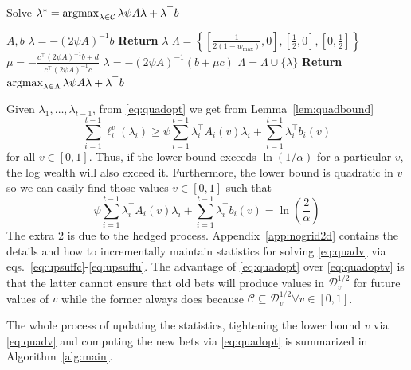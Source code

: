\begin{algorithm}[tb]
   \caption{Solve $\lambda^* = \operatorname*{argmax}_{\lambda \in \mathcal{C}} \lambda \psi A \lambda + \lambda^\top b$}
   \label{alg:argmax}
\begin{algorithmic}
     $A, b$
    \STATE $\lambda = -(2\psi A)^{-1} b$
        \STATE \textbf{Return} $\lambda$
    \ENDIF
    \STATE $\Lambda = \left\{\left[\frac{1}{2(1-w_{\max})},0\right],\left[\frac12,0\right],\left[0,\frac12\right]\right\}$     
    \STATE $\mu = -\frac{c^\top (2\psi A)^{-1}b+d}{c^\top (2\psi A)^{-1}c}$
    \STATE $\lambda = -(2\psi A)^{-1} (b + \mu c)$ 
    \STATE $\Lambda = \Lambda \cup \{\lambda\}$ 
    \ENDIF 
    \ENDFOR
    \STATE \textbf{Return}  $\operatorname*{argmax}_{\lambda \in \Lambda} \lambda \psi A \lambda + \lambda^\top b$
\end{algorithmic}
\end{algorithm}

Given $\lambda_1,\ldots,\lambda_{t-1}$, from \eqref{eq:quadopt} 
we get from Lemma~\ref{lem:quadbound} 
\[
\sum_{i=1}^{t-1} \ell_i^v(\lambda_i)
\geq
\psi  
 \sum_{i=1}^{t-1} \lambda_i^\top A_i(v)\lambda_i  +  \sum_{i=1}^{t-1} \lambda_i^\top b_i(v)
\]
for all $v \in [0,1]$. Thus, if the lower bound exceeds $\ln(1/\alpha)$ 
for a particular $v$, the log wealth will also exceed it. Furthermore,
the lower bound is quadratic in $v$ so we can easily find those values
$v \in [0,1]$ such that
\begin{equation}
   \psi  
 \sum_{i=1}^{t-1} \lambda_i^\top A_i(v)\lambda_i  +  \sum_{i=1}^{t-1} \lambda_i^\top b_i(v) = \ln\left(\frac{2}{\alpha}\right) 
 \label{eq:quadv}
\end{equation} 
The extra $2$ is due to the hedged process. 
Appendix~\ref{app:nogrid2d} contains the details and 
how to incrementally maintain statistics for solving
\eqref{eq:quadv} via eqs.~\eqref{eq:upsuffc}-\eqref{eq:upsuffu}.
The advantage of \eqref{eq:quadopt}
over \eqref{eq:quadoptv} is that the latter cannot 
ensure that old bets will produce values in $\mathcal{D}_v^{1/2}$ for 
future values of $v$ while the former always does
because 
$\mathcal{C} \subseteq \mathcal{D}_{v}^{1/2} \forall v \in [0,1]$. 

The whole process of updating the statistics,
tightening the lower bound $v$ via \eqref{eq:quadv}
and computing the new bets via \eqref{eq:quadopt}
is summarized in Algorithm~\ref{alg:main}.

